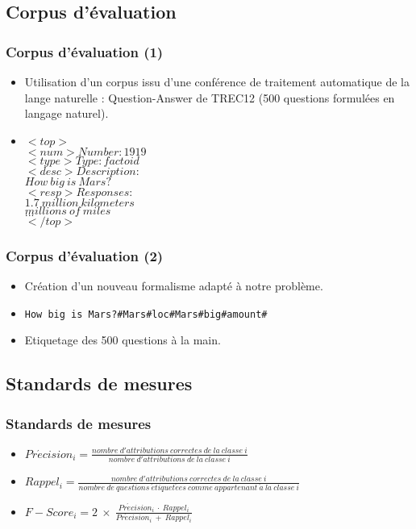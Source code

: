 \documentclass[xcolor=dvipsnames]{beamer}
\begin{document}
\subsection{Corpus d'évaluation}
\frame
{
  \frametitle{Corpus d'évaluation (1)}
  \begin{itemize}
    \item<1-> Utilisation d'un corpus issu d'une conférence de traitement automatique de la lange naturelle : Question-Answer de TREC12 (500 questions formulées en langage naturel).
    \item<2-> $<top>$\\
$<num> Number: 1919$\\
$<type> Type: factoid$\\
$<desc> Description:$\\
$How \: big \: is \: Mars?$\\
$<resp> Responses:$\\
$1.7 \: million \: kilometers$\\
$millions \: of \: miles$\\
$...$\\
$</top>$
  \end{itemize}
}
\frame
{
  \frametitle{Corpus d'évaluation (2)}
  \begin{itemize}
    \item<1-> Création d'un nouveau formalisme adapté à notre problème.
    \item<2-> \texttt{How big is Mars?\#Mars\#loc\#Mars\#big\#amount\#}
    \item<3-> Etiquetage des 500 questions \og{}à la main\fg{}. 
  \end{itemize}
}
\subsection{Standards de mesures}
\frame
{
  \frametitle{Standards de mesures}
  \begin{itemize}
    \item<1-> $Pr\acute{e}cision_i = \frac{nombre \: d'attributions \: correctes \: de \: la \: classe \: i}{nombre \: d'attributions \: de \: la \: classe \: i}$
    \item<2-> $Rappel_i = \frac{nombre \: d'attributions \: correctes \: de \: la \: classe \: i}{nombre \: de \: questions \: \acute{e}tiquet\acute{e}es \: comme \: appartenant \: \grave{a} \: la \: classe \: i}$
    \item<3-> $F-Score_i = 2 \: \times \: \frac{Pr\acute{e}cision_i \: \cdot \: Rappel_i}{Pr\acute{e}cision_i \: + \: Rappel_i}$
  \end{itemize}
}
\end{document}
